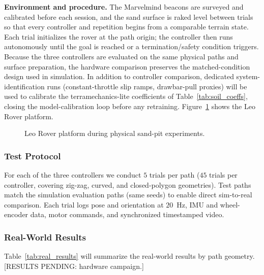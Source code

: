 \documentclass[conference]{IEEEtran}
\begin{document}
\vspace{1mm}
\noindent\textbf{Environment and procedure.} The Marvelmind beacons are surveyed and calibrated before each session, and the sand surface is raked level between trials so that every controller and repetition begins from a comparable terrain state. Each trial initializes the rover at the path origin; the controller then runs autonomously until the goal is reached or a termination/safety condition triggers. Because the three controllers are evaluated on the same physical paths and surface preparation, the hardware comparison preserves the matched-condition design used in simulation. In addition to controller comparison, dedicated system-identification runs (constant-throttle slip ramps, drawbar-pull proxies) will be used to calibrate the terramechanics-lite coefficients of Table~\ref{tab:soil_coeffs}, closing the model-calibration loop before any retraining. Figure~\ref{fig:rover} shows the Leo Rover platform.

\begin{figure}[t]
\centering
{}
\caption{Leo Rover platform during physical sand-pit experiments.}
\label{fig:rover}
\end{figure}

\subsubsection{Test Protocol}
For each of the three controllers we conduct $5$ trials per path ($45$ trials per controller, covering zig-zag, curved, and closed-polygon geometries). Test paths match the simulation evaluation paths (same seeds) to enable direct sim-to-real comparison. Each trial logs pose and orientation at $20$~Hz, IMU and wheel-encoder data, motor commands, and synchronized timestamped video.

\subsubsection{Real-World Results}
Table~\ref{tab:real_results} will summarize the real-world results by path geometry. [RESULTS PENDING: hardware campaign.]
\end{document}
